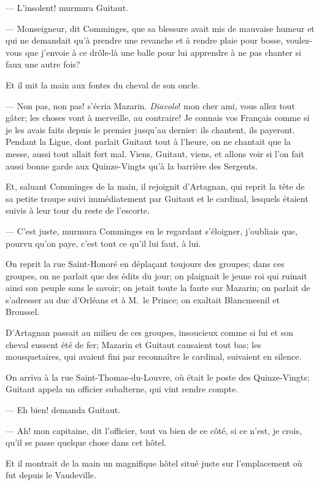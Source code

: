 — L'insolent! murmura Guitaut.

— Monseigneur, dit Comminges, que sa blessure avait mis de mauvaise humeur et qui ne demandait qu'à prendre une revanche et à rendre plaie pour bosse, voulez-vous que j'envoie à ce drôle-là une balle pour lui apprendre à ne pas chanter si faux une autre fois?

Et il mit la main aux fontes du cheval de son oncle.

— Non pas, non pas! s'écria Mazarin. \textit{Diavolo}! mon cher ami, vous allez tout gâter; les choses vont à merveille, au contraire! Je connais vos Français comme si je les avais faits depuis le premier jusqu'au dernier: ils chantent, ils payeront. Pendant la Ligue, dont parlait Guitaut tout à l'heure, on ne chantait que la messe, aussi tout allait fort mal. Viens, Guitaut, viens, et allons voir si l'on fait aussi bonne garde aux Quinze-Vingts qu'à la barrière des Sergents.

Et, saluant Comminges de la main, il rejoignit d'Artagnan, qui reprit la tête de sa petite troupe suivi immédiatement par Guitaut et le cardinal, lesquels étaient suivis à leur tour du reste de l'escorte.

— C'est juste, murmura Comminges en le regardant s'éloigner, j'oubliais que, pourvu qu'on paye, c'est tout ce qu'il lui faut, à lui.

On reprit la rue Saint-Honoré en déplaçant toujours des groupes; dans ces groupes, on ne parlait que des édits du jour; on plaignait le jeune roi qui ruinait ainsi son peuple sans le savoir; on jetait toute la faute sur Mazarin; on parlait de s'adresser au duc d'Orléans et à M.~le Prince; on exaltait Blancmesnil et Broussel.

D'Artagnan passait au milieu de ces groupes, insoucieux comme si lui et son cheval eussent été de fer; Mazarin et Guitaut causaient tout bas; les mousquetaires, qui avaient fini par reconnaître le cardinal, suivaient en silence.

On arriva à la rue Saint-Thomas-du-Louvre, où était le poste des Quinze-Vingts; Guitaut appela un officier subalterne, qui vint rendre compte.

— Eh bien! demanda Guitaut.

— Ah! mon capitaine, dit l'officier, tout va bien de ce côté, si ce n'est, je crois, qu'il se passe quelque chose dans cet hôtel.

Et il montrait de la main un magnifique hôtel situé juste sur l'emplacement où fut depuis le Vaudeville.

